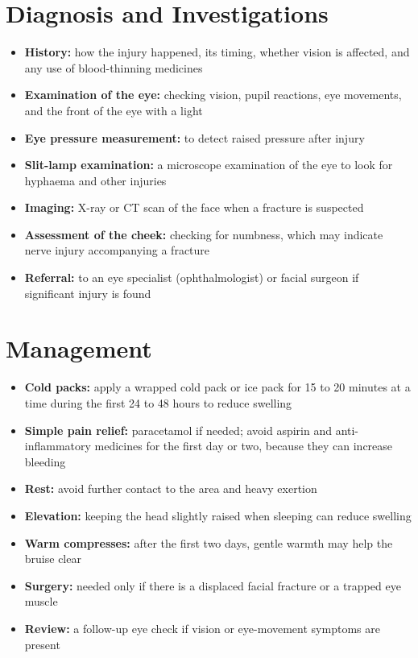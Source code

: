 \section*{Diagnosis and Investigations}
\begin{itemize}
    \item \textbf{History:} how the injury happened, its timing, whether vision is affected, and any use of blood-thinning medicines
    \item \textbf{Examination of the eye:} checking vision, pupil reactions, eye movements, and the front of the eye with a light
    \item \textbf{Eye pressure measurement:} to detect raised pressure after injury
    \item \textbf{Slit-lamp examination:} a microscope examination of the eye to look for hyphaema and other injuries
    \item \textbf{Imaging:} X-ray or CT scan of the face when a fracture is suspected
    \item \textbf{Assessment of the cheek:} checking for numbness, which may indicate nerve injury accompanying a fracture
    \item \textbf{Referral:} to an eye specialist (ophthalmologist) or facial surgeon if significant injury is found
\end{itemize}

\section*{Management}
\begin{itemize}
    \item \textbf{Cold packs:} apply a wrapped cold pack or ice pack for 15 to 20 minutes at a time during the first 24 to 48 hours to reduce swelling
    \item \textbf{Simple pain relief:} paracetamol if needed; avoid aspirin and anti-inflammatory medicines for the first day or two, because they can increase bleeding
    \item \textbf{Rest:} avoid further contact to the area and heavy exertion
    \item \textbf{Elevation:} keeping the head slightly raised when sleeping can reduce swelling
    \item \textbf{Warm compresses:} after the first two days, gentle warmth may help the bruise clear
    \item \textbf{Surgery:} needed only if there is a displaced facial fracture or a trapped eye muscle
    \item \textbf{Review:} a follow-up eye check if vision or eye-movement symptoms are present
\end{itemize}

